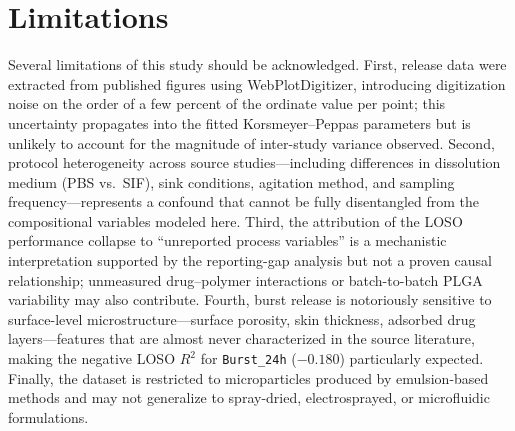 \documentclass[preprint,12pt,authoryear]{elsarticle}
\begin{document}
\FloatBarrier

\section{Limitations}
\label{sec:limitations}

Several limitations of this study should be acknowledged. First, release data were extracted from published figures using WebPlotDigitizer, introducing digitization noise on the order of a few percent of the ordinate value per point; this uncertainty propagates into the fitted Korsmeyer--Peppas parameters but is unlikely to account for the magnitude of inter-study variance observed. Second, protocol heterogeneity across source studies---including differences in dissolution medium (PBS vs.\ SIF), sink conditions, agitation method, and sampling frequency---represents a confound that cannot be fully disentangled from the compositional variables modeled here. Third, the attribution of the LOSO performance collapse to ``unreported process variables'' is a mechanistic interpretation supported by the reporting-gap analysis but not a proven causal relationship; unmeasured drug--polymer interactions or batch-to-batch PLGA variability may also contribute. Fourth, burst release is notoriously sensitive to surface-level microstructure---surface porosity, skin thickness, adsorbed drug layers---features that are almost never characterized in the source literature, making the negative LOSO $R^2$ for \texttt{Burst\_24h} ($-0.180$) particularly expected. Finally, the dataset is restricted to microparticles produced by emulsion-based methods and may not generalize to spray-dried, electrosprayed, or microfluidic formulations.
\end{document}
